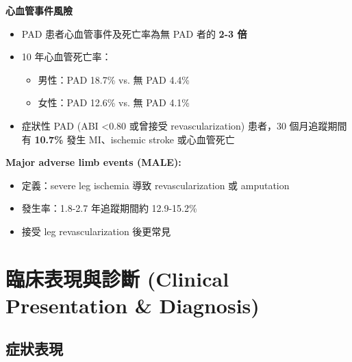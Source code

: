 \documentclass[12pt,a4paper]{article}
\begin{document}
\begin{importantbox}
\textbf{心血管事件風險}
\begin{itemize}[leftmargin=2em]
    \item PAD 患者心血管事件及死亡率為無 PAD 者的 \textbf{2-3 倍}
    \item 10 年心血管死亡率：
    \begin{itemize}
        \item 男性：PAD 18.7\% vs. 無 PAD 4.4\%
        \item 女性：PAD 12.6\% vs. 無 PAD 4.1\%
    \end{itemize}
    \item 症狀性 PAD (ABI <0.80 或曾接受 revascularization) 患者，30 個月追蹤期間有 \textbf{10.7\%} 發生 MI、ischemic stroke 或心血管死亡
\end{itemize}
\end{importantbox}

\textbf{Major adverse limb events (MALE):}
\begin{itemize}[leftmargin=2em]
    \item 定義：severe leg ischemia 導致 revascularization 或 amputation
    \item 發生率：1.8-2.7 年追蹤期間約 12.9-15.2\%
    \item 接受 leg revascularization 後更常見
\end{itemize}

\section{臨床表現與診斷 (Clinical Presentation \& Diagnosis)}

\subsection{症狀表現}

\end{document}
